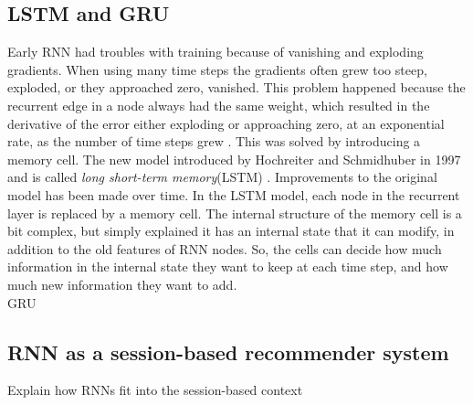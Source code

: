\subsection{LSTM and GRU}
Early RNN had troubles with training because of vanishing and exploding gradients. When using many time steps the gradients often grew too steep, exploded, or they approached zero, vanished. This problem happened because the recurrent edge in a node always had the same weight, which resulted in the derivative of the error either exploding or approaching zero, at an exponential rate, as the number of time steps grew \cite{DBLP:journals/corr/Lipton15}. This was solved by introducing a memory cell. The new model introduced by Hochreiter and Schmidhuber in 1997 and is called \textit{long short-term memory}(LSTM) \cite{Hochreiter96bridginglong}. Improvements to the original model has been made over time. In the LSTM model, each node in the recurrent layer is replaced by a memory cell. The internal structure of the memory cell is a bit complex, but simply explained it has an internal state that it can modify, in addition to the old features of RNN nodes. So, the cells can decide how much information in the internal state they want to keep at each time step, and how much new information they want to add.\\

GRU

\subsection{RNN as a session-based recommender system}
Explain how RNNs fit into the session-based context



